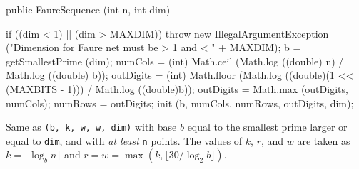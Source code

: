 \begin{code}

   public FaureSequence (int n, int dim) \begin{hide} {
      if ((dim < 1) || (dim > MAXDIM))
         throw new IllegalArgumentException
            ("Dimension for Faure net must be > 1 and < " + MAXDIM);
      b = getSmallestPrime (dim);
      numCols = (int) Math.ceil (Math.log ((double) n)
                                 / Math.log ((double) b));
      outDigits = (int) Math.floor (Math.log ((double)(1 << (MAXBITS - 1)))
                                 / Math.log ((double)b));
      outDigits = Math.max (outDigits, numCols);
      numRows = outDigits;
      init (b, numCols, numRows, outDigits, dim);
   }
\end{hide}
\end{code}
\begin{tabb}
  Same as \texttt{(b, k, w, w, dim)}
  with base $b$ equal to the smallest prime larger or equal to \texttt{dim},
  and with \emph{at least} \texttt{n} points.
  The values of $k$, $r$, and $w$ are taken as
  $k = \lceil \log_b n\rceil$ and
  $r = w = \max(k, \lfloor 30 / \log_2 b\rfloor)$.
\end{tabb}
\begin{htmlonly}
\end{htmlonly}
